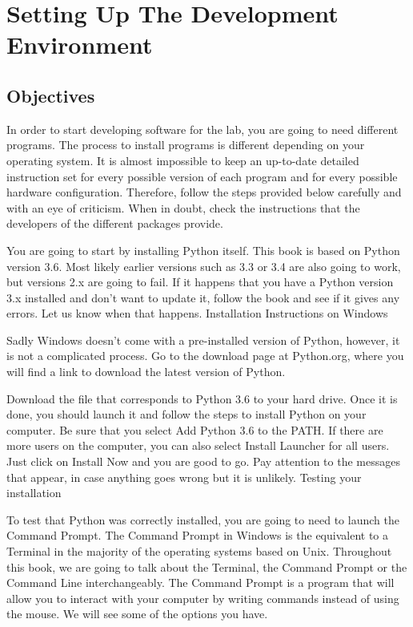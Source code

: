 \chapter{Setting Up The Development Environment}
\section{Objectives}
In order to start developing software for the lab, you are going to need different programs. The process to install programs is different depending on your operating system. It is almost impossible to keep an up-to-date detailed instruction set for every possible version of each program and for every possible hardware configuration. Therefore, follow the steps provided below carefully and with an eye of criticism. When in doubt, check the instructions that the developers of the different packages provide.

You are going to start by installing Python itself. This book is based on Python version 3.6. Most likely earlier versions such as 3.3 or 3.4 are also going to work, but versions 2.x are going to fail. If it happens that you have a Python version 3.x installed and don’t want to update it, follow the book and see if it gives any errors. Let us know when that happens.
Installation Instructions on Windows

Sadly Windows doesn’t come with a pre-installed version of Python, however, it is not a complicated process. Go to the download page at Python.org, where you will find a link to download the latest version of Python.

Download the file that corresponds to Python 3.6 to your hard drive. Once it is done, you should launch it and follow the steps to install Python on your computer. Be sure that you select Add Python 3.6 to the PATH. If there are more users on the computer, you can also select Install Launcher for all users. Just click on Install Now and you are good to go. Pay attention to the messages that appear, in case anything goes wrong but it is unlikely.
Testing your installation

To test that Python was correctly installed, you are going to need to launch the Command Prompt. The Command Prompt in Windows is the equivalent to a Terminal in the majority of the operating systems based on Unix. Throughout this book, we are going to talk about the Terminal, the Command Prompt or the Command Line interchangeably. The Command Prompt is a program that will allow you to interact with your computer by writing commands instead of using the mouse. We will see some of the options you have.

